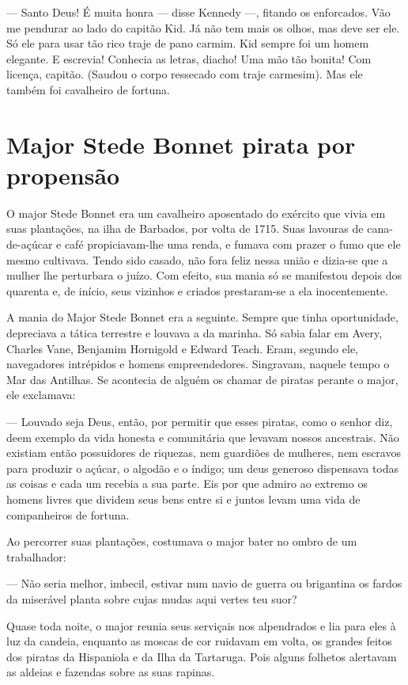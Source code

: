 --- Santo Deus! É muita honra --- disse Kennedy ---, fitando os enforcados. Vão me
pendurar ao lado do capitão Kid. Já não tem mais os olhos, mas deve ser
ele. Só ele para usar tão rico traje de pano carmim. Kid sempre foi um
homem elegante. E escrevia! Conhecia as letras, diacho! Uma mão tão
bonita! Com licença, capitão. (Saudou o corpo ressecado com traje
carmesim). Mas ele também foi cavalheiro de fortuna.

\chapter{Major Stede Bonnet pirata por propensão}

O major Stede Bonnet era um cavalheiro aposentado do exército que vivia em
suas plantações, na ilha de Barbados, por volta de 1715. Suas lavouras de
cana-de-açúcar e café propiciavam-lhe uma renda, e fumava com prazer o
fumo que ele mesmo cultivava. Tendo sido casado, não fora feliz nessa
união e dizia-se que a mulher lhe perturbara o juízo. Com efeito, sua
mania só se manifestou depois dos quarenta e, de início, seus vizinhos e
criados prestaram-se a ela inocentemente.

A mania do Major Stede Bonnet era a seguinte. Sempre que tinha
oportunidade, depreciava a tática terrestre e louvava a da marinha. Só
sabia falar em Avery, Charles Vane, Benjamim Hornigold e Edward Teach.
Eram, segundo ele, navegadores intrépidos e homens empreendedores.
Singravam, naquele tempo o Mar das Antilhas. Se acontecia de alguém os
chamar de piratas perante o major, ele exclamava:

--- Louvado seja Deus, então, por permitir que esses piratas, como o senhor
diz, deem exemplo da vida honesta e comunitária que levavam nossos
ancestrais. Não existiam então possuidores de riquezas, nem guardiões de
mulheres, nem escravos para produzir o açúcar, o algodão e o índigo; um
deus generoso dispensava todas as coisas e cada um recebia a sua parte.
Eis por que admiro ao extremo os homens livres que dividem seus bens entre
si e juntos levam uma vida de companheiros de fortuna.

Ao percorrer suas plantações, costumava o major bater no ombro de um
trabalhador:

--- Não seria melhor, imbecil, estivar num navio de guerra ou brigantina os
fardos da miserável planta sobre cujas mudas aqui vertes teu suor?

Quase toda noite, o major reunia seus serviçais nos alpendrados e lia para
eles à luz da candeia, enquanto as moscas de cor ruidavam em volta, os
grandes feitos dos piratas da Hispaniola e da Ilha da Tartaruga. Pois
alguns folhetos alertavam as aldeias e fazendas sobre as suas rapinas. 

